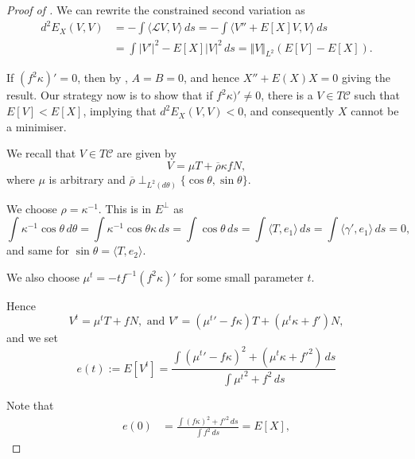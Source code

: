 \documentclass[12pt]{article}
\begin{document}
\begin{proof}[Proof of ]
We can rewrite the constrained second variation as
\begin{align*}d^2E_X(V,V)&=-\int\langle\mathcal{L}V, V\rangle \,ds= -\int\langle V''+ E[X]V, V\rangle \,ds\\&=  \int| V'|^2- E[X]|V|^2\,ds= \Vert V\Vert_{L^2}\left( E[V]-E[X]\right).
\end{align*}

If $(f^2\kappa)'=0$, then by , $A=B=0$, and hence $X'' + E(X) X = 0$ giving the result. Our strategy now is to show that if \(f^2\kappa)' \ne 0\), there is a $V\in T\mathcal{C}$ such that $E[V]<E[X]$, implying that $d^2E_X(V,V)<0$, and consequently $X$ cannot be a minimiser.

We recall that $V\in T\mathcal{C}$ are given by $$V=\mu T + \overline{\rho}\kappa f N,$$ where $\mu$ is arbitrary and $\overline{\rho}\perp_{L^2(d\theta)}\lbrace\cos\theta,\sin\theta\rbrace$.

We choose $\rho=\kappa^{-1}$.    This is in $E^\perp$ as $$\int \kappa^{-1}\cos\theta\,d\theta= \int\kappa^{-1}\cos\theta \kappa\,ds= \int \cos\theta\,ds= \int \langle T,e_1\rangle\,ds= \int \langle \gamma',e_1\rangle\,ds=0,$$
and same for $\sin\theta=\langle T, e_2\rangle$.

We  also choose $\mu^t=-{t}{f}^{-1}(f^2\kappa)'$ for some small parameter $t$.

Hence $$V^t= \mu^t T + f N, \text{ and }V'=({\mu^t}'-f\kappa )T+ (\mu^t\kappa + f')N,$$
and we set
$$e(t):= E[V^t]= \frac{\int ({\mu^t}'-f\kappa)^2 + (\mu^t\kappa+ f'^2 )\,ds }{\int {\mu^t}^2 + f^2 \,ds }$$


Note that
 \begin{align*} e(0)
&= \frac{\int (f\kappa)^2 + f'^2 \,ds }{\int  f^2 \,ds }= E[X],
\end{align*}


\end{proof}
\end{document}
